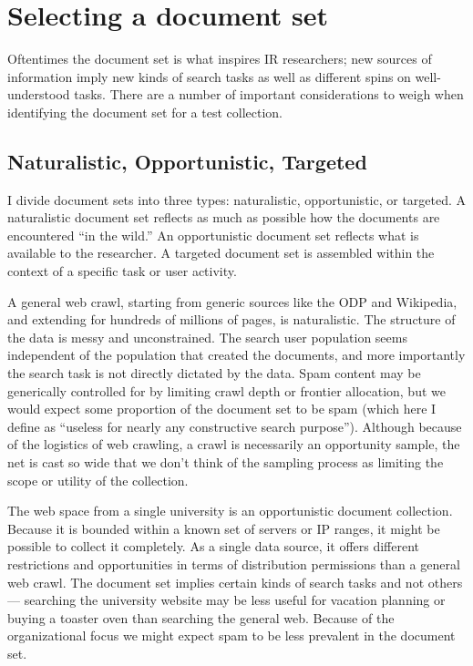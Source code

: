 \documentclass[nobib]{tufte-book}
\begin{document}
\chapter{Selecting a document set}

Oftentimes the document set is what inspires IR researchers; new sources of information imply new kinds of search tasks as well as different spins on well-understood tasks.  There are a number of important considerations to weigh when identifying the document set for a test collection.

\section{Naturalistic, Opportunistic, Targeted}

I divide document sets into three types: naturalistic, opportunistic, or targeted.  A naturalistic document set reflects as much as possible how the documents are encountered ``in the wild.''  An opportunistic document set reflects what is available to the researcher.  A targeted document set is assembled within the context of a specific task or user activity.

A general web crawl, starting from generic sources like the ODP and Wikipedia, and extending for hundreds of millions of pages, is naturalistic.  The structure of the data is messy and unconstrained.  The search user population seems independent of the population that created the documents, and more importantly the search task is not directly dictated by the data.  Spam content may be generically controlled for by limiting crawl depth or frontier allocation, but we would expect some proportion of the document set to be spam (which here I define as ``useless for nearly any constructive search purpose'').  Although because of the logistics of web crawling, a crawl is necessarily an opportunity sample, the net is cast so wide that we don't think of the sampling process as limiting the scope or utility of the collection.

The web space from a single university is an opportunistic document collection.  Because it is bounded within a known set of servers or IP ranges, it might be possible to collect it completely.  As a single data source, it offers different restrictions and opportunities in terms of distribution permissions than a general web crawl.  The document set implies certain kinds of search tasks and not others --- searching the university website may be less useful for vacation planning or buying a toaster oven than searching the general web.  Because of the organizational focus we might expect spam to be less prevalent in the document set.
\end{document}
